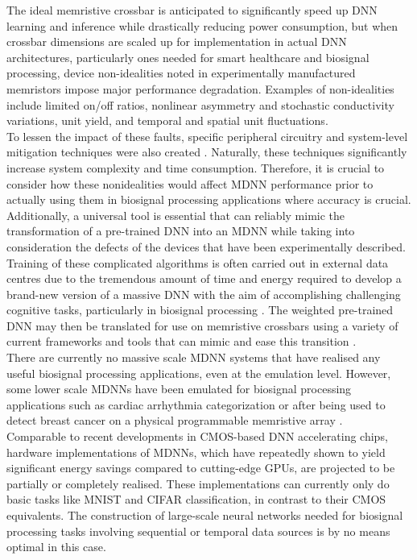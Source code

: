 \noindent The ideal memristive crossbar is anticipated to significantly speed up DNN learning and inference while drastically reducing power consumption, but when crossbar dimensions are scaled up for implementation in actual DNN architectures, particularly ones needed for smart healthcare and biosignal processing, device non-idealities noted in experimentally manufactured memristors impose major performance degradation. Examples of non-idealities include limited on/off ratios, nonlinear asymmetry and stochastic conductivity variations, unit yield, and temporal and spatial unit fluctuations. \\

\noindent To lessen the impact of these faults, specific peripheral circuitry and system-level mitigation techniques were also created \cite{yu2015scaling}. Naturally, these techniques significantly increase system complexity and time consumption. Therefore, it is crucial to consider how these nonidealities would affect MDNN performance prior to actually using them in biosignal processing applications where accuracy is crucial. Additionally, a universal tool is essential that can reliably mimic the transformation of a pre-trained DNN into an MDNN while taking into consideration the defects of the devices that have been experimentally described.\\

\noindent Training of these complicated algorithms is often carried out in external data centres due to the tremendous amount of time and energy required to develop a brand-new version of a massive DNN with the aim of accomplishing challenging cognitive tasks, particularly in biosignal processing \cite{bien2018deep}. The weighted pre-trained DNN may then be translated for use on memristive crossbars using a variety of current frameworks and tools that can mimic and ease this transition \cite{ankit2019puma}. \\

\noindent There are currently no massive scale MDNN systems that have realised any useful biosignal processing applications, even at the emulation level. However, some lower scale MDNNs have been emulated for biosignal processing applications such as cardiac arrhythmia categorization \cite{hassan2018real} or after being used to detect breast cancer on a physical programmable memristive array \cite{cai2019fully}. \\

\noindent Comparable to recent developments in CMOS-based DNN accelerating chips, hardware implementations of MDNNs, which have repeatedly shown to yield significant energy savings compared to cutting-edge GPUs, are projected to be partially or completely realised. These implementations can currently only do basic tasks like MNIST and CIFAR classification, in contrast to their CMOS equivalents. The construction of large-scale neural networks needed for biosignal processing tasks involving sequential or temporal data sources is by no means optimal in this case. 

